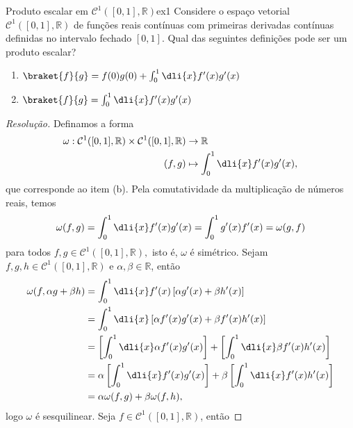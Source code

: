 \begin{exercício}{Produto escalar em \(\mathcal{C}^1([0,1], \mathbb{R})\)}{ex1}
   Considere o espaço vetorial \(\mathcal{C}^1([0,1], \mathbb{R})\) de funções reais contínuas com primeiras derivadas contínuas definidas no intervalo fechado \([0,1]\). Qual das seguintes definições pode ser um produto escalar?
   \begin{enumerate}[label=(\alph*)]
      \item \(\braket{f}{g} = f(0) g(0) + \int_0^1 \dli{x} f'(x)g'(x)\)
      \item \(\braket{f}{g} = \int_0^1 \dli{x} f'(x)g'(x)\)
   \end{enumerate}
\end{exercício}
\begin{proof}[Resolução]
   Definamos a forma
   \begin{align*}
      \omega : \mathcal{C}^1([0,1], \mathbb{R}) \times \mathcal{C}^1([0,1], \mathbb{R}) &\to \mathbb{R}\\
                                                                                  (f,g) &\mapsto \int_0^1 \dli{x} f'(x)g'(x),
   \end{align*}
   que corresponde ao item (b). Pela comutatividade da multiplicação de números reais, temos
   \begin{equation*}
      \omega(f,g) = \int_0^1 \dli{x} f'(x) g'(x) = \int_0^1 g'(x) f'(x) = \omega(g, f)
   \end{equation*}
   para todos \(f,g \in \mathcal{C}^1([0,1], \mathbb{R}),\) isto é, \(\omega\) é simétrico. Sejam \(f,g,h \in \mathcal{C}^1([0,1], \mathbb{R})\) e \(\alpha, \beta \in \mathbb{R}\), então
   \begin{align*}
      \omega(f, \alpha g + \beta h) &= \int_0^1 \dli{x} f'(x) \left[\alpha g'(x) + \beta h'(x)\right]\\
                                    &= \int_0^1 \dli{x} \left[\alpha f'(x) g'(x) + \beta f'(x) h'(x)\right]\\
                                    &= \left[\int_0^1 \dli{x} \alpha f'(x) g'(x) \right] + \left[\int_0^1 \dli{x} \beta f'(x)h'(x)\right]\\
                                    &= \alpha \left[\int_0^1 \dli{x} f'(x) g'(x)\right] + \beta \left[\int_0^1 \dli{x} f'(x) h'(x)\right]\\
                                    &= \alpha \omega(f, g) + \beta \omega(f, h),
   \end{align*}
   logo \(\omega\) é sesquilinear. Seja \(f \in \mathcal{C}^1([0,1], \mathbb{R})\), então

\end{proof}
